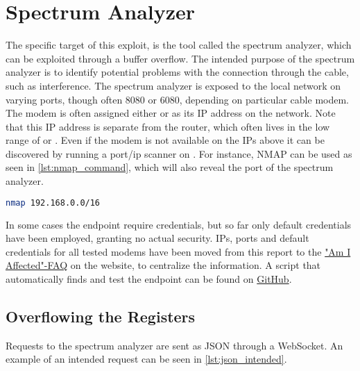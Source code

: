 \chapter{Spectrum Analyzer}
The specific target of this exploit, is the tool called the spectrum analyzer, which can be exploited through a buffer overflow.
The intended purpose of the spectrum analyzer is to identify potential problems with the connection through the cable, such as interference.
The spectrum analyzer is exposed to the local network on varying ports, though often 8080 or 6080, depending on particular cable modem.
The modem is often assigned either  or  as its IP address on the network. Note that this IP address is separate from the router, which often lives in the low range of  or . Even if the modem is not available on the IPs above it can be discovered by running a port/ip scanner on . For instance, NMAP can be used as seen in \cref{lst:nmap_command}, which will also reveal the port of the spectrum analyzer.

\begin{lstlisting}[language=sh,firstnumber=1,label={lst:nmap_command},caption={The NMAP request to find the Spectrum Analyser},float]
    nmap 192.168.0.0/16
\end{lstlisting}

In some cases the endpoint require credentials, but so far only default credentials have been employed, granting no actual security. IPs, ports and default credentials for all tested modems have been moved from this report to the \href{https://cablehaunt.com/#faq-am-i-affected}{"Am I Affected"-FAQ} on the \exploitname{} website, to centralize the information.
A script that automatically finds and test the endpoint can be found on \href{https://github.com/Lyrebirds/cable-haunt-vulnerability-test}{GitHub}. 

\section{Overflowing the Registers}
Requests to the spectrum analyzer are sent as JSON through a WebSocket. An example of an intended request can be seen in \cref{lst:json_intended}.


